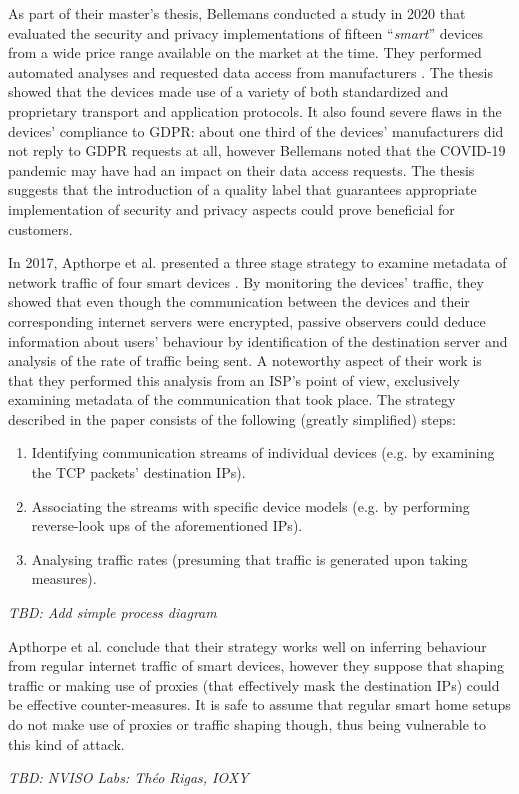 As part of their master's thesis, Bellemans conducted a study in 2020 that evaluated the security and privacy implementations of fifteen \enquote{\emph{smart}} devices from a wide price range available on the market at the time. They performed automated analyses and requested data access from manufacturers \cite{JonahBellemans}. The thesis showed that the devices made use of a variety of both standardized and proprietary transport and application protocols. It also found severe flaws in the devices' compliance to \ac{GDPR}: about one third of the devices' manufacturers did not reply to \ac{GDPR} requests at all, however Bellemans noted that the COVID-19 pandemic may have had an impact on their data access requests. The thesis suggests that the introduction of a quality label that guarantees appropriate implementation of security and privacy aspects could prove beneficial for customers. \par
In 2017, Apthorpe et al. presented a three stage strategy to examine metadata of network traffic of four smart devices \cite{apthorpe2017smart}. %
By monitoring the devices' traffic, they showed that even though the communication between the devices and their corresponding internet servers were encrypted, passive observers could deduce information about users' behaviour by identification of the destination server and analysis of the rate of traffic being sent. A noteworthy aspect of their work is that they performed this analysis from an \ac{ISP}'s point of view, exclusively examining metadata of the communication that took place. The strategy described in the paper consists of the following (greatly simplified) steps:
\begin{enumerate}
    \item Identifying communication streams of individual devices (e.g. by examining the TCP packets' destination IPs).
    \item Associating the streams with specific device models (e.g. by performing reverse-look ups of the aforementioned IPs).
    \item Analysing traffic rates (presuming that traffic is generated upon taking measures).
\end{enumerate}
\emph{TBD: Add simple process diagram} %


Apthorpe et al. conclude that their strategy works well on inferring behaviour from regular internet traffic of smart devices, however they suppose that shaping traffic or making use of proxies (that effectively mask the destination IPs) could be effective counter-measures. It is safe to assume that regular smart home setups do not make use of proxies or traffic shaping though, thus being vulnerable to this kind of attack. \par
\emph{TBD: NVISO Labs: Théo Rigas, IOXY \cite{rigas_ioxy}} %

